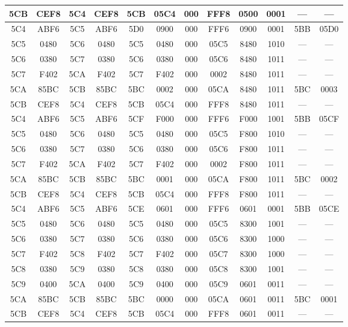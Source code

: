 \begin{center}
\begin{tabular}{|c|c|c|c|c|c|c|c|c|c|c|c|}
5CB & CEF8 & 5C4 & CEF8 & 5CB & 05C4 & 000 & FFF8 & 0500 & 0001 & --- & ---\\
\hline
5C4 & ABF6 & 5C5 & ABF6 & 5D0 & 0900 & 000 & FFF6 & 0900 & 0001 & 5BB & 05D0\\
\hline
5C5 & 0480 & 5C6 & 0480 & 5C5 & 0480 & 000 & 05C5 & 8480 & 1010 & --- & ---\\
\hline
5C6 & 0380 & 5C7 & 0380 & 5C6 & 0380 & 000 & 05C6 & 8480 & 1011 & --- & ---\\
\hline
5C7 & F402 & 5CA & F402 & 5C7 & F402 & 000 & 0002 & 8480 & 1011 & --- & ---\\
\hline
5CA & 85BC & 5CB & 85BC & 5BC & 0002 & 000 & 05CA & 8480 & 1011 & 5BC & 0003\\
\hline
5CB & CEF8 & 5C4 & CEF8 & 5CB & 05C4 & 000 & FFF8 & 8480 & 1011 & --- & ---\\
\hline
5C4 & ABF6 & 5C5 & ABF6 & 5CF & F000 & 000 & FFF6 & F000 & 1001 & 5BB & 05CF\\
\hline
5C5 & 0480 & 5C6 & 0480 & 5C5 & 0480 & 000 & 05C5 & F800 & 1010 & --- & ---\\
\hline
5C6 & 0380 & 5C7 & 0380 & 5C6 & 0380 & 000 & 05C6 & F800 & 1011 & --- & ---\\
\hline
5C7 & F402 & 5CA & F402 & 5C7 & F402 & 000 & 0002 & F800 & 1011 & --- & ---\\
\hline
5CA & 85BC & 5CB & 85BC & 5BC & 0001 & 000 & 05CA & F800 & 1011 & 5BC & 0002\\
\hline
5CB & CEF8 & 5C4 & CEF8 & 5CB & 05C4 & 000 & FFF8 & F800 & 1011 & --- & ---\\
\hline
5C4 & ABF6 & 5C5 & ABF6 & 5CE & 0601 & 000 & FFF6 & 0601 & 0001 & 5BB & 05CE\\
\hline
5C5 & 0480 & 5C6 & 0480 & 5C5 & 0480 & 000 & 05C5 & 8300 & 1001 & --- & ---\\
\hline
5C6 & 0380 & 5C7 & 0380 & 5C6 & 0380 & 000 & 05C6 & 8300 & 1000 & --- & ---\\
\hline
5C7 & F402 & 5C8 & F402 & 5C7 & F402 & 000 & 05C7 & 8300 & 1000 & --- & ---\\
\hline
5C8 & 0380 & 5C9 & 0380 & 5C8 & 0380 & 000 & 05C8 & 8300 & 1001 & --- & ---\\
\hline
5C9 & 0400 & 5CA & 0400 & 5C9 & 0400 & 000 & 05C9 & 0601 & 0011 & --- & ---\\
\hline
5CA & 85BC & 5CB & 85BC & 5BC & 0000 & 000 & 05CA & 0601 & 0011 & 5BC & 0001\\
\hline
5CB & CEF8 & 5C4 & CEF8 & 5CB & 05C4 & 000 & FFF8 & 0601 & 0011 & --- & ---\\

\end{tabular}
\end{center}
